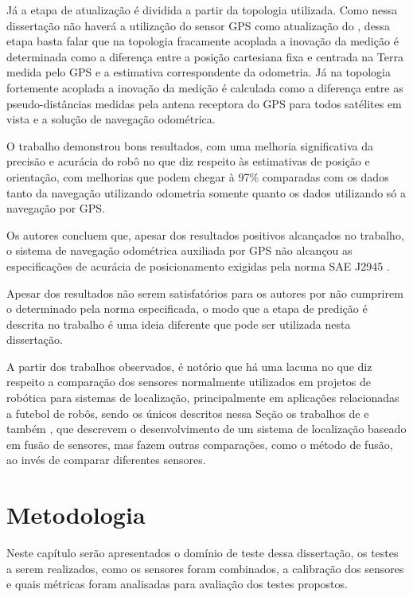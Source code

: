 \documentclass[acronym, symbols, table, deposito]{fei}
\begin{document}
Já a etapa de atualização é dividida a partir da topologia utilizada. Como nessa dissertação não haverá a utilização do sensor GPS como atualização do , dessa etapa basta falar que na topologia fracamente acoplada a inovação da medição é determinada como a diferença entre a posição cartesiana fixa e centrada na Terra medida pelo GPS e a estimativa correspondente da odometria. Já na topologia fortemente acoplada a inovação da medição é calculada como a diferença entre as pseudo-distâncias medidas pela antena receptora do GPS para todos satélites em vista e a solução de navegação odométrica.

O trabalho demonstrou bons resultados, com uma melhoria significativa da precisão e acurácia do robô no que diz respeito às estimativas de posição e orientação, com melhorias que podem chegar à 97\% comparadas com os dados tanto da navegação utilizando odometria somente quanto os dados utilizando só a navegação por GPS.

Os autores concluem que, apesar dos resultados positivos alcançados no trabalho, o sistema de navegação odométrica auxiliada por GPS não alcançou as especificações de acurácia de posicionamento exigidas pela norma SAE J2945 \cite{sae2016board}.

Apesar dos resultados não serem satisfatórios para os autores por não cumprirem o determinado pela norma especificada, o modo que a etapa de predição é descrita no trabalho é uma ideia diferente que pode ser utilizada nesta dissertação.


A partir dos trabalhos observados, é notório que há uma lacuna no que diz respeito a comparação dos sensores normalmente utilizados em projetos de robótica para sistemas de localização, principalmente em aplicações relacionadas a futebol de robôs, sendo os únicos descritos nessa Seção os trabalhos de \textcite{aguiar2017kalman} e também \cite{ismail2022soccer}, que descrevem o desenvolvimento de um sistema de localização baseado em fusão de sensores, mas fazem outras comparações, como o método de fusão, ao invés de comparar diferentes sensores.
			
\chapter{Metodologia}\label{sec:metodologia}

	Neste capítulo serão apresentados o domínio de teste dessa dissertação, os testes a serem realizados, como os sensores foram combinados, a calibração dos sensores e quais métricas foram analisadas para avaliação dos testes propostos.
	
\end{document}
